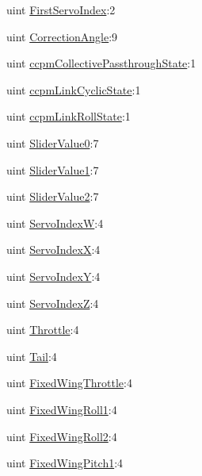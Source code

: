 \begin{DoxyCompactItemize}
\item 
uint \hyperlink{group___config_plugin_ga7db78067a379a075d4ead422019337d3}{First\-Servo\-Index}\-:2
\item 
uint \hyperlink{group___config_plugin_ga9540a6905aee7cc229adfd3bd687b86a}{Correction\-Angle}\-:9
\item 
uint \hyperlink{group___config_plugin_ga14bffa0ebae107df7ec9a9b6e06294a9}{ccpm\-Collective\-Passthrough\-State}\-:1
\item 
uint \hyperlink{group___config_plugin_ga31785760b6dab4f2006d4824ef4b7e5b}{ccpm\-Link\-Cyclic\-State}\-:1
\item 
uint \hyperlink{group___config_plugin_gaecc16f8488db13ba16c2c6e1d0053239}{ccpm\-Link\-Roll\-State}\-:1
\item 
uint \hyperlink{group___config_plugin_ga2787c0bb4ab205071860d7a5c90cb7a6}{Slider\-Value0}\-:7
\item 
uint \hyperlink{group___config_plugin_gab1ae7499273b5e51087ce2da94c0acab}{Slider\-Value1}\-:7
\item 
uint \hyperlink{group___config_plugin_ga86cc56b0247155cf5d5ef0e31d509fed}{Slider\-Value2}\-:7
\item 
uint \hyperlink{group___config_plugin_gaffe6aa75cde814b5068ce3494b2abb34}{Servo\-Index\-W}\-:4
\item 
uint \hyperlink{group___config_plugin_ga0d592171bd6f7381c2a33dfed5f7c40d}{Servo\-Index\-X}\-:4
\item 
uint \hyperlink{group___config_plugin_ga517baa5d4109f802400efeb8a5897b1b}{Servo\-Index\-Y}\-:4
\item 
uint \hyperlink{group___config_plugin_ga661c3e27f6844865ea7244fa1363516e}{Servo\-Index\-Z}\-:4
\item 
uint \hyperlink{group___config_plugin_ga5045493288e2ee044c68dafe0a02b05c}{Throttle}\-:4
\item 
uint \hyperlink{group___config_plugin_ga904a0b19b372c87ddf027435cd9e7723}{Tail}\-:4
\item 
uint \hyperlink{group___config_plugin_ga2c5e7e1c1622df1735c63b2a700b1f30}{Fixed\-Wing\-Throttle}\-:4
\item 
uint \hyperlink{group___config_plugin_ga674f11a566247fc5041091e940c5d679}{Fixed\-Wing\-Roll1}\-:4
\item 
uint \hyperlink{group___config_plugin_ga1d932ff664060c5dd74bb8ec48b4d8ff}{Fixed\-Wing\-Roll2}\-:4
\item 
uint \hyperlink{group___config_plugin_ga13162fedce809405cef3920e6e81a8bc}{Fixed\-Wing\-Pitch1}\-:4
\item 

\end{DoxyCompactItemize}
